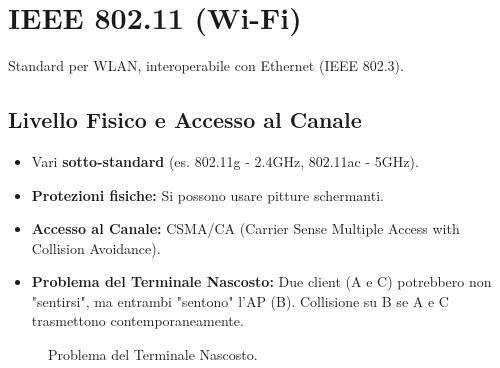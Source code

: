 \documentclass{article}
\begin{document}
\section{IEEE 802.11 (Wi-Fi)}
Standard per WLAN, interoperabile con Ethernet (IEEE 802.3).

\subsection{Livello Fisico e Accesso al Canale}
\begin{itemize}
    \item Vari \textbf{sotto-standard} (es. 802.11g - 2.4GHz, 802.11ac - 5GHz).
    \item \textbf{Protezioni fisiche:} Si possono usare pitture schermanti.
    \item \textbf{Accesso al Canale:} CSMA/CA (Carrier Sense Multiple Access with Collision Avoidance).
    \item \textbf{Problema del Terminale Nascosto:} Due client (A e C) potrebbero non "sentirsi", ma entrambi "sentono" l'AP (B). Collisione su B se A e C trasmettono contemporaneamente.
\end{itemize}
\begin{figure}[H]
    \centering
    \caption{Problema del Terminale Nascosto.}
    \label{fig:hidden_terminal}
\end{figure}
\end{document}
